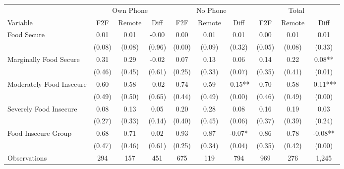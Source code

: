 \begin{tabular}{l*{9}c}
\hline\hline
 & \multicolumn{3}{c}{Own Phone} & \multicolumn{3}{c}{No Phone} & \multicolumn{3}{c}{Total}\\ 
Variable & F2F & Remote & Diff & F2F & Remote & Diff & F2F & Remote & Diff \\
\hline
Food Secure&0.01&0.01&-0.00&0.00&0.01&0.01&0.00&0.01&0.01\\
&(0.08)&(0.08)&(0.96)&(0.00)&(0.09)&(0.32)&(0.05)&(0.08)&(0.33)\\
Marginally Food Secure&0.31&0.29&-0.02&0.07&0.13&0.06&0.14&0.22&0.08**\\
&(0.46)&(0.45)&(0.61)&(0.25)&(0.33)&(0.07)&(0.35)&(0.41)&(0.01)\\
Moderately Food Insecure&0.60&0.58&-0.02&0.74&0.59&-0.15**&0.70&0.58&-0.11***\\
&(0.49)&(0.50)&(0.65)&(0.44)&(0.49)&(0.00)&(0.46)&(0.49)&(0.00)\\
Severely Food Insecure&0.08&0.13&0.05&0.20&0.28&0.08&0.16&0.19&0.03\\
&(0.27)&(0.33)&(0.14)&(0.40)&(0.45)&(0.06)&(0.37)&(0.39)&(0.24)\\
Food Insecure Group&0.68&0.71&0.02&0.93&0.87&-0.07*&0.86&0.78&-0.08**\\
&(0.47)&(0.46)&(0.61)&(0.25)&(0.34)&(0.04)&(0.35)&(0.42)&(0.00)\\
\hline
Observations & 294 & 157 & 451 & 675 & 119 & 794 & 969 & 276 & 1,245 \\
\hline\hline
\end{tabular}
